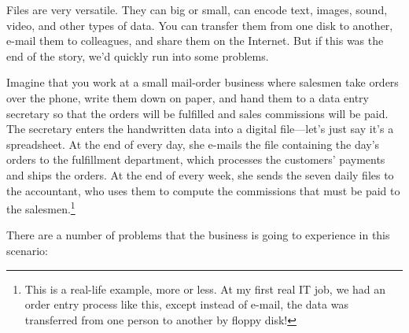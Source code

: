 \documentclass[11pt]{book}
\begin{document}
Files are very versatile.  They can big or small, can encode text, images, sound, video, and other types of data.  You can transfer them from one disk to another, e-mail them to colleagues, and share them on the Internet.  But if this was the end of the story, we'd quickly run into some problems.

Imagine that you work at a small mail-order business where salesmen take orders over the phone, write them down on paper, and hand them to a data entry secretary so that the orders will be fulfilled and sales commissions will be paid.  The secretary enters the handwritten data into a digital file---let's just say it's a spreadsheet.  At the end of every day, she e-mails the file containing the day's orders to the fulfillment department, which processes the customers' payments and ships the orders.  At the end of every week, she sends the seven daily files to the accountant, who uses them to compute the commissions that must be paid to the salesmen.\footnote{This is a real-life example, more or less. At my first real IT job, we had an order entry process like this, except instead of e-mail, the data was transferred from one person to another by floppy disk!}  

There are a number of problems that the business is going to experience in this scenario:
\end{document}
